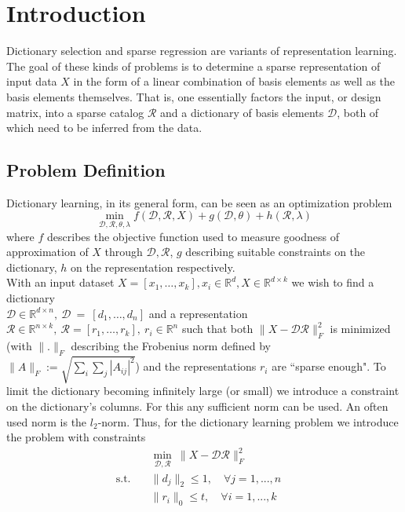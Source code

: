 \documentclass{article}
\newcommand{\R}{\mathbb{R}}
\newcommand{\Rr}{\mathcal{R}}
\newcommand{\D}{\mathcal{D}}
\begin{document}
\section{Introduction}\label{sec:intro}

Dictionary selection and sparse regression are variants of representation learning. The goal of these kinds of problems is to determine a sparse representation of input data $X$ in the form of a linear combination of basis elements as well as the basis elements themselves. That is, one essentially factors the input, or design matrix, into a sparse catalog $\mathcal{R}$ and a dictionary of basis elements $\mathcal{D}$, both of which need to be inferred from the data.\\

\subsection{Problem Definition}\label{sec:problem}
\noindent Dictionary learning, in its general form, can be seen as an optimization problem
\[
\min_{\D, \Rr, \theta, \lambda} f(\D, \Rr, X) + g(\D, \theta) + h(\Rr, \lambda)
\]
where $f$ describes the objective function used to measure goodness of approximation of $X$ through $\D, \Rr$, $g$ describing suitable constraints on the dictionary, $h$ on the representation respectively.\\

\noindent With an input dataset $X=[x_1, \dots, x_k],  x_i \in \R^d,  X \in \R^{d\times k}$ we wish to find a dictionary\\
$\D \in \R^{d\times n}, \   \D~=~[d_1, \dots, d_n]$ and a representation $\Rr \in\R^{n\times k}, \ \Rr = [r_1,\dots,r_k], \ r_i\in\R^n $  such that both $\|X-\D\Rr\|_F^2$ is minimized (with $\| . \|_F$ describing the Frobenius norm defined by $\|A\|_F := \sqrt{\sum_i\sum_j |A_{ij}|^2}$) and the representations $r_i$ are ``sparse enough". To limit the dictionary becoming infinitely large (or small) we introduce a constraint on the dictionary's columns. For this any sufficient norm can be used. An often used norm is the $l_2$-norm. 
Thus, for the dictionary learning problem we introduce the problem with constraints
\begin{align*}
         &\min_{\D, \Rr} \ \|X  -\D \Rr\|_F^2   \quad   \\
         \text{s.t.}  \quad  &\|d_j\|_2 \leq 1, \quad \forall j=1, ...,n  \quad \\
          \quad  &\|r_i\|_0 \leq t,  \quad \forall i=1, ...,k  \quad 
\end{align*}
\end{document}
